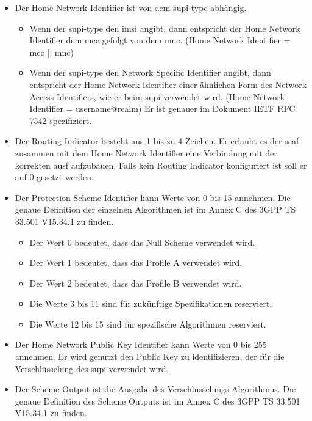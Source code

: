 \begin{itemize}
\item Der Home Network Identifier ist von dem \gls{supi-type} abhängig.
\begin{itemize}
\item Wenn der \gls{supi-type} den \gls{imsi} angibt, dann entspricht der Home Network Identifier dem \gls{mcc} gefolgt von dem \gls{mnc}. (Home Network Identifier = \gls{mcc} || \gls{mnc})
\item Wenn der \gls{supi-type} den Network Specific Identifier angibt, dann entspricht der Home Network Identifier einer ähnlichen Form des Network Access Identifiers, wie er beim \gls{supi} verwendet wird. (Home Network Identifier = username@realm)
Er ist genauer im Dokument IETF RFC 7542 spezifiziert. %
\end{itemize}
\item Der Routing Indicator besteht aus 1 bis zu 4 Zeichen. %
Er erlaubt es der \gls{seaf} zusammen mit dem Home Network Identifier eine Verbindung mit der korrekten \gls{ausf} aufzubauen.
Falls kein Routing Indicator konfiguriert ist soll er auf 0 gesetzt werden.
\item Der Protection Scheme Identifier kann Werte von 0 bis 15 annehmen.
Die genaue Definition der einzelnen Algorithmen ist im Annex C des 3GPP TS 33.501 V15.34.1 zu finden. %
\begin{itemize}
\item Der Wert 0 bedeutet, dass das Null Scheme verwendet wird.
\item Der Wert 1 bedeutet, dass das Profile A verwendet wird.
\item Der Wert 2 bedeutet, dass das Profile B verwendet wird.
\item Die Werte 3 bis 11 sind für zukünftige Spezifikationen reserviert.
\item Die Werte 12 bis 15 sind für spezifische Algorithmen reserviert.
\end{itemize}
\item Der Home Network Public Key Identifier kann Werte von 0 bis 255 annehmen.
Er wird genutzt den Public Key zu identifizieren, der für die Verschlüsselung des \gls{supi} verwendet wird.
\item Der Scheme Output ist die Ausgabe des Verschlüsselungs-Algorithmus.
Die genaue Definition des Scheme Outputs ist im Annex C des 3GPP TS 33.501 V15.34.1 zu finden. %
\end{itemize}


